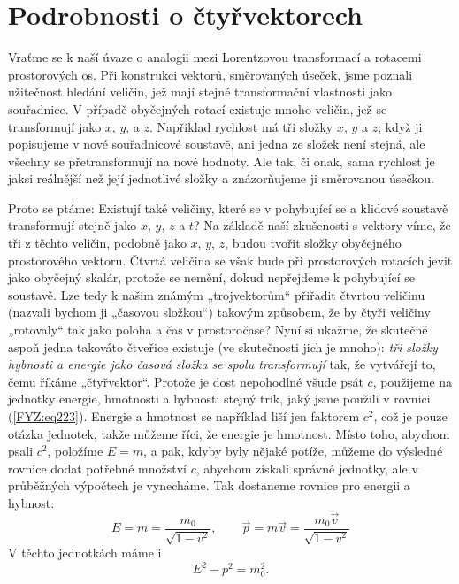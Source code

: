 {  \section{Podrobnosti o čtyřvektorech}\label{fyz:IchapXVIIsecIV}
    Vraťme se k naší úvaze o analogii mezi Lorentzovou transformací a rotacemi prostorových os. Při 
    konstrukci vektorů, směrovaných úseček, jsme poznali užitečnost hledání veličin, jež mají 
    stejné transformační vlastnosti jako souřadnice. V případě obyčejných rotací existuje mnoho 
    veličin, jež se transformují jako \(x\), \(y\), a \(z\). Například rychlost má tři složky 
    \(x\), \(y\) a \(z\); když ji popisujeme v nové souřadnicové soustavě, ani jedna ze složek není 
    stejná, ale všechny se přetransformují na nové hodnoty. Ale tak, či onak, sama rychlost je 
    jaksi reálnější než její jednotlivé složky a znázorňujeme ji směrovanou úsečkou.
    
    Proto se ptáme: Existují také veličiny, které se v pohybující se a klidové soustavě 
    transformují stejně jako \(x\), \(y\), \(z\) a \(t\)? Na základě naší zkušenosti s vektory 
    víme, že tři z těchto veličin, podobně jako \(x\), \(y\), \(z\), budou tvořit složky obyčejného 
    prostorového vektoru. Čtvrtá veličina se však bude při prostorových rotacích jevit jako 
    obyčejný skalár, protože se nemění, dokud nepřejdeme k pohybující se soustavě. Lze tedy k našim 
    známým „trojvektorům“ přiřadit čtvrtou veličinu (nazvali bychom ji „časovou složkou“) takovým 
    způsobem, že by čtyři veličiny „rotovaly“ tak jako poloha a čas v prostoročase? Nyní si ukažme, 
    že skutečně aspoň jedna takováto čtveřice existuje (ve skutečnosti jich je mnoho): \emph{tři 
    složky hybnosti a energie jako časová složka se spolu transformují} tak, že vytvářejí to, čemu 
    říkáme „čtyřvektor“. Protože je dost nepohodlné všude psát \(c\), použijeme na jednotky 
    energie, hmotnosti a hybnosti stejný trik, jaký jsme použili v rovnici (\ref{FYZ:eq223}). 
    Energie a hmotnost se například liší jen faktorem \(c^2\), což je pouze otázka jednotek, takže 
    můžeme říci, že energie je hmotnost. Místo toho, abychom psali \(c^2\), položíme \(E = m\), a 
    pak, kdyby byly nějaké potíže, můžeme do výsledné rovnice dodat potřebné množství \(c\), 
    abychom získali správné jednotky, ale v průběžných výpočtech je vynecháme. Tak dostaneme 
    rovnice pro energii a hybnost:
    \begin{equation}\label{FYZ:eq225}
      E = m = \dfrac{m_0}{\sqrt{1 - v^2}}, \qquad
      \vec{p} = m\vec{v} = \dfrac{m_0\vec{v}}{\sqrt{1 - v^2}}
    \end{equation}
    V těchto jednotkách máme i
    \begin{equation}\label{FYZ:eq226}
      E^2 - p^2 = m_0^2.
    \end{equation}
    
}
